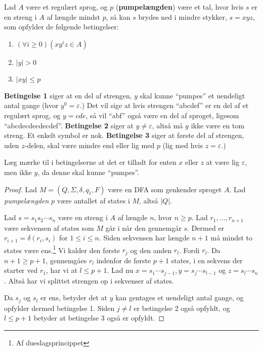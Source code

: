 \begin{theorem}[Pumpelemmaet]
	\label{the:pumpelemma}
	Lad $A$ være et regulært sprog, og $p$ (\textbf{pumpelængden}) være et tal, hvor hvis $s$ er en streng i $A$ af længde mindst $p$, så kan $s$ brydes ned i mindre stykker, $s = xyz$, som opfylder de følgende betingelser:
	\begin{enumerate}
		\item $(\forall i \geq 0)(xy^{i}z \in A)$
		\item $|y| > 0$
		\item $|xy| \leq p$
	\end{enumerate}
\end{theorem}

\textbf{Betingelse 1} siger at en del af strengen, $y$ skal kunne ``pumpes'' et uendeligt antal gange (hvor $y^{0} = \varepsilon$.) Det vil sige at hvis strengen ``abcdef'' er en del af et regulært sprog, og $y = cde$, så vil ``abf'' også være en del af sproget, ligesom ``abcdecdecdecdef''.
\textbf{Betingelse 2} siger at $y \neq \varepsilon$, altså må $y$ ikke være en tom streng. Et enkelt symbol er nok.
\textbf{Betingelse 3} siger at første del af strengen, uden $z$-delen, skal være mindre end eller lig med $p$ (lig med hvis $z = \varepsilon$.)

Læg mærke til i betingelserne at det er tilladt for enten $x$ eller $z$ at være lig $\varepsilon$, men ikke $y$, da denne skal kunne ``pumpes''.

\begin{proof}
	Lad $M = (Q, \Sigma, \delta, q_{1}, F)$ være en DFA som genkender sproget $A$. Lad \textit{pumpelængden} $p$ være antallet af states i $M$, altså $|Q|$.

	Lad $s = s_{1}s_{2} \cdots s_{n}$ være en streng i $A$ af længde $n$, hvor $n \geq p$. Lad $r_{1}, \ldots, r_{n+1}$ være sekvensen af states som $M$ går i når den gennemgår $s$. Dermed er $r_{i+1} = \delta(r_i, s_{i})$ for $1 \leq i \leq n$. Siden sekvensen har længde $n+1$ må mindst to states være ens.\footnote{Af dueslagsprincippet} Vi kalder den første $r_{j}$ og den anden $r_{l}$. Fordi $r_{l}$. Da $n+1 \geq p+1$, gennemgåes $r_{l}$ indenfor de første $p+1$ states, i en sekvens der starter ved $r_{1}$, har vi at $l \leq p+1$. Lad nu $x = s_{1} \cdots s_{j-1}, y = s_{j} \cdots s_{l-1}$ og $z = s_{l} \cdots s_{n}$. Altså har vi splittet strengen op i sekvenser af states.

	Da $s_{j}$ og $s_{l}$ er ens, betyder det at $y$ kan gentages et uendeligt antal gange, og opfylder dermed betingelse 1. Siden $j \neq l$ er betingelse 2 også opfyldt, og $l \leq p+1$ betyder at betingelse 3 også er opfyldt.
\end{proof}


